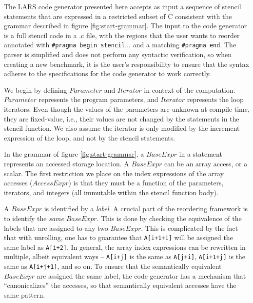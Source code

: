 The LARS code generator presented here accepts as input a sequence of stencil
statements that are expressed in a restricted subset of C consistent with the
grammar described in figure \ref{fig:start-grammar}. The input to the code
generator is a full stencil code in a .c file, with the regions that the user
wants to reorder annotated with \texttt{\#pragma begin stencil$\ldots$} and a
matching \texttt{\#pragma end}. The parser is simplified and does not perform
any syntactic verification, so when creating a new benchmark, it is the user's
responsibility to ensure that the syntax adheres to the specifications for the
code generator to work correctly. 

We begin by defining $\mathit{Parameter}$ and $\mathit{Iterator}$ in context of
the computation. $\mathit{Parameter}$ represents the program parameters, and
$\mathit{Iterator}$ represents the loop iterators. Even though the values of
the parameters are unknown at compile time, they are fixed-value, i.e., their
values are not changed by the statements in the stencil function. We also
assume the iterator is only modified by the increment expression of the loop,
and not by the stencil statements.
 
In the grammar of figure \ref{fig:start-grammar}, a $\mathit{BaseExpr}$ in a
statement represents an accessed storage location. A $\mathit{BaseExpr}$ can be
an array access, or a scalar. The first restriction we place on the index
expressions of the array accesses ($\mathit{AccessExpr}$) is that they must be
a function of the parameters, iterators, and integers (all immutable within the
stencil function body).

A $\mathit{BaseExpr}$ is identified by a \textit{label}. A crucial part of the
reordering framework is to identify the \textit{same} $\mathit{BaseExpr}$. This
is done by checking the equivalence of the labels that are assigned to any two
$\mathit{BaseExpr}$. This is complicated by the fact that with unrolling, one
has to guarantee that \texttt{A[i+1+1]} will be assigned the same label as
\texttt{A[i+2]}. In general, the array index expressions can be rewritten in
multiple, albeit equivalent ways -- \texttt{A[i+j]} is the same as
\texttt{A[j+i]}, \texttt{A[i+1+j]} is the same as \texttt{A[i+j+1]}, and so on.
To ensure that the semantically equivalent $\mathit{BaseExpr}$ are assigned the
same label, the code generator has a mechanism that ``canonicalizes'' the
accesses, so that semantically equivalent accesses have the same pattern. 

